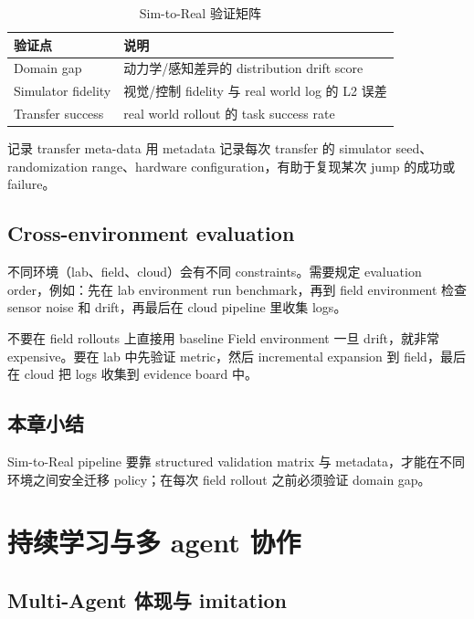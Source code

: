 \documentclass[a4paper]{article}
\begin{document}
\begin{table}[H]
\centering
\begin{tabular}{p{} p{}}
\toprule
验证点 & 说明 \\
\midrule
Domain gap & 动力学/感知差异的 distribution drift score \\
Simulator fidelity & 视觉/控制 fidelity 与 real world log 的 L2 误差 \\
Transfer success & real world rollout 的 task success rate \\
\bottomrule
\end{tabular}
\caption{Sim-to-Real 验证矩阵}
\end{table}

\begin{knowledgebox}{记录 transfer meta-data}
用 metadata 记录每次 transfer 的 simulator seed、randomization range、hardware configuration，有助于复现某次 jump 的成功或 failure。
\end{knowledgebox}

\subsection{Cross-environment evaluation}

不同环境（lab、field、cloud）会有不同 constraints。需要规定 evaluation order，例如：先在 lab environment run benchmark，再到 field environment 检查 sensor noise 和 drift，再最后在 cloud pipeline 里收集 logs。

\begin{warningbox}{不要在 field rollouts 上直接用 baseline}
Field environment 一旦 drift，就非常 expensive。要在 lab 中先验证 metric，然后 incremental expansion 到 field，最后在 cloud 把 logs 收集到 evidence board 中。
\end{warningbox}

\subsection{本章小结}

Sim-to-Real pipeline 要靠 structured validation matrix 与 metadata，才能在不同环境之间安全迁移 policy；在每次 field rollout 之前必须验证 domain gap。

\section{持续学习与多 agent 协作}

\subsection{Multi-Agent 体现与 imitation}
\end{document}
